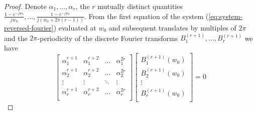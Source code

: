 \documentclass[a4paper, 11pt]{article}
\begin{document}
\begin{proof}
  Denote $\alpha_1, \ldots, \alpha_r$, the $r$ mutually distinct quantities $\frac{1-e^{-jw_0}}{jw_0}, \ldots, 
  \frac{1-e^{-jw_0}}{j(w_0+2\pi(r-1))}$. From the first equation of the system (\ref{eq:system-reversed-fourier}) 
  evaluated at $w_0$ and subsequent translates by multiples of $2\pi$ and the $2\pi$-periodicity of the discrete Fourier 
  transforms $B_1^{(r+1)}, \ldots, B_r^{(r+1)}$ we have
  \begin{equation}
    \begin{bmatrix}
      \alpha_1^{r+1} & \alpha_1^{r+2} & \hdots & \alpha_1^{2r} \\
      \alpha_2^{r+1} & \alpha_2^{r+2} & \hdots & \alpha_2^{2r} \\
      \vdots & \vdots & \ddots & \vdots \\
      \alpha_r^{r+1} & \alpha_r^{r+2} & \hdots & \alpha_r^{2r} \\
    \end{bmatrix}
    \begin{bmatrix}
      B_1^{(r+1)}(w_0) \\
      B_2^{(r+1)}(w_0) \\
      \vdots \\
      B_r^{(r+1)}(w_0) \\
    \end{bmatrix}
    = 0
  \end{equation}


\end{proof}
\end{document}
